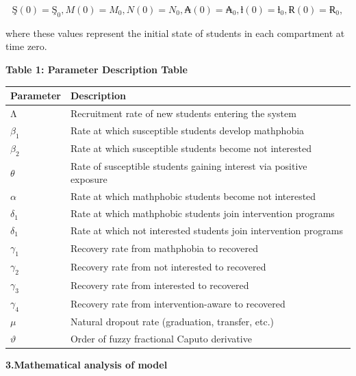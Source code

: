 \[Ş(0) = Ş_{0},M(0) = M_{0},N(0) = N_{0},₳(0) = ₳_{0},ƚ(0) = ƚ_{0},Ɍ(0) = Ɍ_{0},\]

where these values represent the initial state of students in each compartment at time zero.

\textbf{Table 1: Parameter Description Table}

{\def\LTcaptype{none} %
\begin{longtable}[]{@{}
  >{\centering\arraybackslash}p{}
  >{\raggedright\arraybackslash}p{}@{}}
\toprule\noalign{}
\begin{minipage}[b]{\linewidth}\centering
\textbf{Parameter}
\end{minipage} & \begin{minipage}[b]{\linewidth}\raggedright
\textbf{Description}
\end{minipage} \\
\midrule\noalign{}
\endhead
\bottomrule\noalign{}
\endlastfoot
Λ & Recruitment rate of new students entering the system \\
\(\beta_{1}\) & Rate at which susceptible students develop mathphobia \\
\(\beta_{2}\) & Rate at which susceptible students become not interested \\
\(\theta\) & Rate of susceptible students gaining interest via positive exposure \\
\(\alpha\) & Rate at which mathphobic students become not interested \\
\(\delta_{1}\) & Rate at which mathphobic students join intervention programs \\
\(\delta_{1}\) & Rate at which not interested students join intervention programs \\
\(\gamma_{1}\) & Recovery rate from mathphobia to recovered \\
\(\gamma_{2}\) & Recovery rate from not interested to recovered \\
\(\gamma_{3}\) & Recovery rate from interested to recovered \\
\(\gamma_{4}\) & Recovery rate from intervention-aware to recovered \\
\(\mu\) & Natural dropout rate (graduation, transfer, etc.) \\
\(\vartheta\) & Order of fuzzy fractional Caputo derivative \\
\end{longtable}
}

\textbf{3.Mathematical analysis of model}

